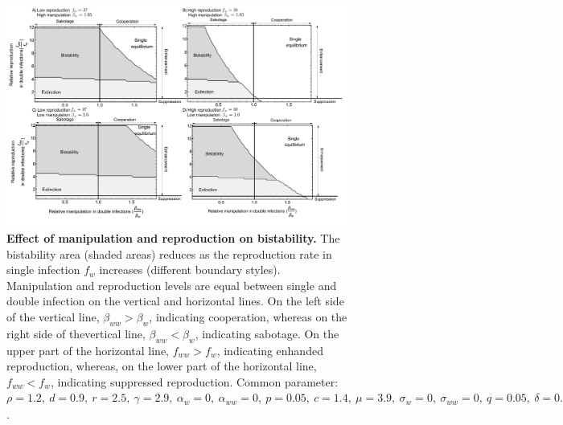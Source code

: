 \documentclass[a4paper]{scrartcl}
\begin{document}
\begin{figure}[!ht]
\captionsetup{format=plain}
\centering
\includegraphics[width=\textwidth]{Figures/manip_bifur.pdf}
\caption{\textbf{Effect of manipulation and reproduction on bistability.}
The bistability area (shaded areas) reduces as the reproduction rate in single infection $f_w$ increases (different boundary styles).
Manipulation and reproduction levels are equal between single and double infection on the vertical and horizontal lines. On the left side of the vertical line, $\beta_{ww} > \beta_{w}$, indicating cooperation, whereas on the right side of thevertical line, $\beta_{ww} < \beta_{w}$, indicating sabotage. On the upper part of the horizontal line, $f_{ww} > f_w$, indicating enhanded reproduction, whereas, on the lower part of the horizontal line, $f_{ww} < f_w$, indicating suppressed reproduction.
Common parameter:  $\rho = 1.2, \ d = 0.9, \ r = 2.5, \ \gamma = 2.9, \ \alpha_w = 0, \ \alpha_{ww} = 0, \ p = 0.05, \ c = 1.4, \ \mu = 3.9, \ \sigma_w = 0, \ \sigma_{ww} = 0, \ q = 0.05, \ \delta = 0.9, \ k = 0.26, \  \beta_w = 1.65, h = 0.6$.}
\label{fig:manipbifur}
\end{figure}
\end{document}
